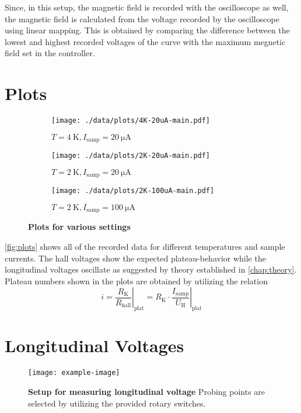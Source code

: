 Since, in this setup, the magnetic field is recorded with the oscilloscope as well, the magnetic field is calculated from the voltage recorded by the oscilloscope using linear mapping.
This is obtained by comparing the difference between the lowest and highest recorded voltages of the curve with the maximum megnetic field set in the controller.

\section{Plots}
\begin{figure}
	\centering
	\begin{subfigure}{.32\textwidth}
		\centering
		\texttt{[image: ./data/plots/4K-20uA-main.pdf]}
		\caption{$T=\SI{4}{\kelvin}, I_\text{samp} = \SI{20}{\micro\ampere}$}
	\end{subfigure}
	\hspace*{\fill}
	\begin{subfigure}{.32\textwidth}
		\centering
		\texttt{[image: ./data/plots/2K-20uA-main.pdf]}
		\caption{$T=\SI{2}{\kelvin}, I_\text{samp} = \SI{20}{\micro\ampere}$}
	\end{subfigure}
	\hspace*{\fill}
	\begin{subfigure}{.32\textwidth}
		\centering
		\texttt{[image: ./data/plots/2K-100uA-main.pdf]}
		\caption{$T=\SI{2}{\kelvin}, I_\text{samp} = \SI{100}{\micro\ampere}$}
	\end{subfigure}
	\caption[Plots for various settings]{\textbf{Plots for various settings}}
	\label{fig:plots}
\end{figure}
\autoref{fig:plots} shows all of the recorded data for different temperatures and sample currents.
The hall voltages show the expected plateau-behavior while the longitudinal voltages oscillate as suggested by theory established in \autoref{chap:theory}.
Plateau numbers shown in the plots are obtained by utilizing the relation
\begin{equation*}
	i = \left. \frac{R_\text{K}}{R_\text{hall}} \right\rvert_{\text{plat}} = R_\text{K}\cdot\left. \frac{I_\text{samp}}{U_\text{H}}\right\rvert_{\text{plat}}
\end{equation*}

\section{Longitudinal Voltages}
\begin{figure}
	\centering
	\texttt{[image: example-image]}
	\caption[Setup for measuring longitudinal voltage]{\textbf{Setup for measuring longitudinal voltage} Probing points are selected by utilizing the provided rotary switches.}
	\label{fig:setup_long_don_jon}
\end{figure}

